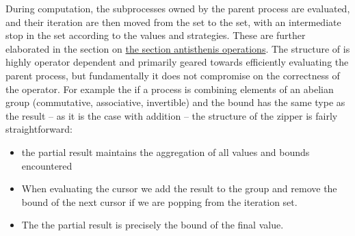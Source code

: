 During computation, the subprocesses owned by the parent process are
evaluated, and their iteration are then moved from the 
set to the  set, with an intermediate stop in the
 set according to the values and strategies. These
are further elaborated in the section on \hyperref[sec:antisthenis_ops]{the
  section antisthenis operations}. The structure of  is highly operator dependent and primarily geared towards
efficiently evaluating the parent process, but fundamentally it does
not compromise on the correctness of the operator. For example the if
a process is combining elements of an abelian group (commutative,
associative, invertible) and the bound has the same type as the result
-- as it is the case with addition -- the structure of the zipper is
fairly straightforward:

\begin{itemize}
\item the partial result maintains the aggregation of all values and
  bounds encountered
\item When evaluating the cursor we add the result to the group and
  remove the bound of the next cursor if we are popping from the
  iteration set.
\item The the partial result is precisely the bound of the final
  value.
\end{itemize}

